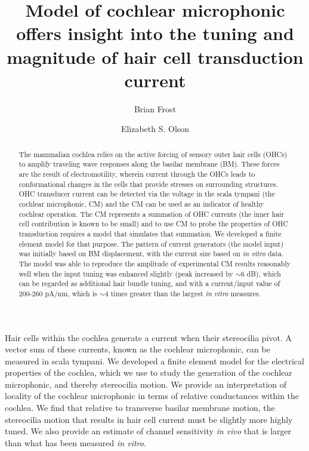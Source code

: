 \documentclass{biophys-new}
\title{Model of cochlear microphonic offers insight into the tuning and magnitude of hair cell transduction current}
\author[1,*]{Brian Frost}
\author[2,3]{Elizabeth S. Olson}
\affil[1]{Electrical Engineering, Columbia University, New York, New York}
\affil[2]{Otolaryngology, Head and Neck Surgery, Columbia University, New York, New York}
\affil[3]{Biomedical Engineering, Columbia University, New York, New York}
\begin{document}
\begin{frontmatter}

\begin{abstract}
The mammalian cochlea relies on the active forcing of sensory outer hair cells (OHCs) to amplify traveling wave responses along the basilar membrane (BM). These forces are the result of electromotility, wherein current through the OHCs leads to conformational changes in the cells that provide stresses on surrounding structures. OHC transducer current can be detected via the voltage in the scala tympani (the cochlear microphonic, CM) and the CM can be used as an indicator of healthy cochlear operation. The CM represents a summation of OHC currents (the inner hair cell contribution is known to be small) and to use CM to probe the properties of OHC transduction requires a model that simulates that summation.  We developed a finite element model for that purpose. The pattern of current generators (the model input) was initially based on BM displacement, with the current size based on \textit{in vitro} data. The model was able to reproduce the amplitude of experimental CM results reasonably well when the input tuning was enhanced slightly (peak increased by $\sim$6 dB), which can be regarded as additional hair bundle tuning, and with a current/input value of 200-260 pA/nm, which is $\sim$4 times greater than the largest \textit{in vitro} measures. 
\end{abstract}

\begin{sigstatement}
Hair cells within the cochlea generate a current when their stereocilia pivot. A vector sum of these currents, known as the cochlear microphonic, can be measured in scala tympani. We developed a finite element model for the electrical properties of the cochlea, which we use to study the generation of the cochlear microphonic, and thereby stereocilia motion. We provide an interpretation of locality of the cochlear microphonic in terms of relative conductances within the cochlea. We find that relative to transverse basilar membrane motion, the stereocilia motion that results in hair cell current must be slightly more highly tuned. We also provide an estimate of channel sensitivity \textit{in vivo} that is larger than what has been measured \textit{in vitro}.
\end{sigstatement}
\end{frontmatter}
\clearpage
\end{document}
